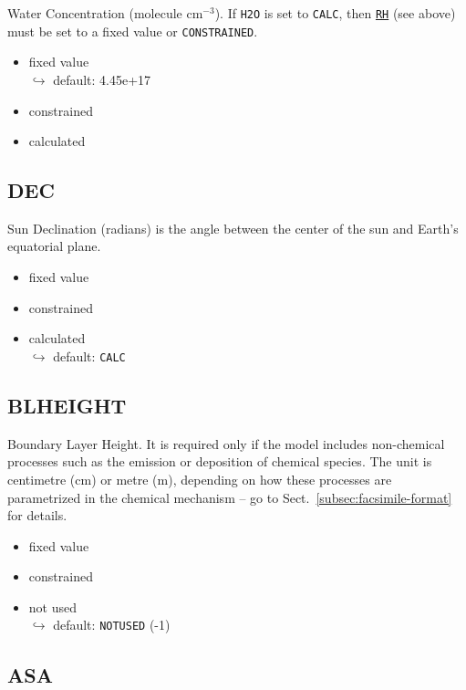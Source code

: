 Water Concentration (molecule cm$^{-3}$). If \texttt{H2O} is set to
\texttt{CALC}, then \hyperref[subsec:rh]{\texttt{RH}} (see above) must
be set to a fixed value or \texttt{CONSTRAINED}.

\begin{itemize}
\item fixed value\\$\hookrightarrow$ default: 4.45e+17
\item constrained
\item calculated
\end{itemize}

\subsection{DEC} \label{subsec:dec}

Sun Declination (radians) is the angle between the center of the sun
and Earth's equatorial plane.

\begin{itemize}
\item fixed value
\item constrained
\item calculated\\$\hookrightarrow$ default: \texttt{CALC}
\end{itemize}

\subsection{BLHEIGHT} \label{subsec:blheight}

Boundary Layer Height. It is required only if the model includes
non-chemical processes such as the emission or deposition of chemical
species. The unit is centimetre (cm) or metre (m), depending on how
these processes are parametrized in the chemical mechanism -- go to
Sect.~\ref{subsec:facsimile-format} for details.

\begin{itemize}
\item fixed value
\item constrained
\item not used\\$\hookrightarrow$ default: \texttt{NOTUSED} (-1)
\end{itemize}

\subsection{ASA} \label{subsec:asa}

